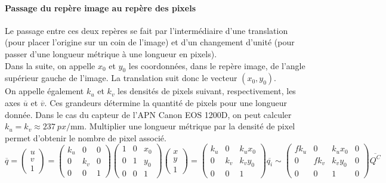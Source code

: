 \documentclass[a4paper, 11pt]{article}
\begin{document}
	\paragraph{Passage du repère image au repère des pixels\\}
		Le passage entre ces deux repères se fait par l'intermédiaire d'une translation (pour placer l'origine sur un coin de l'image) et d'un changement d'unité (pour passer d'une longueur métrique à une longueur en pixels).
		\\Dans la suite, on appelle $x_0$ et $y_0$ les coordonnées, dans le repère image, de l'angle supérieur gauche de l'image. La translation suit donc le vecteur $(x_0, y_0)$.
		\\On appelle également $k_u$ et $k_v$ les densités de pixels suivant, respectivement, les axes $\overline{u}$ et $\overline{v}$. Ces grandeurs détermine la quantité de pixels pour une longueur donnée. Dans le cas du capteur de l'APN Canon EOS 1200D, on peut calculer $k_u = k_v \approx \SI{237}{px\per\milli\meter}$. Multiplier une longueur métrique par la densité de pixel permet d'obtenir le nombre de pixel associé.
		\begin{equation}
			\overline{q} = \begin{pmatrix}
				u\\v\\1
			\end{pmatrix} = \begin{pmatrix}
				k_u & 0 & 0\\
				0 & k_v & 0\\
				0 & 0 & 1
			\end{pmatrix}\begin{pmatrix}
				1 & 0 & x_0\\
				0 & 1 & y_0\\
				0 & 0 & 1
			\end{pmatrix}\begin{pmatrix}
				x\\y\\1
			\end{pmatrix} = \begin{pmatrix}
				k_u & 0 & k_ux_0\\
				0 & k_v & k_vy_0\\
				0 & 0 & 1
			\end{pmatrix} \overline{q_i} \sim \begin{pmatrix}
				fk_u & 0 & k_ux_0 & 0\\
				0 & fk_v & k_vy_0 & 0\\
				0 & 0 & 1 & 0
			\end{pmatrix} \overline{Q^C}
		\end{equation}
\end{document}
